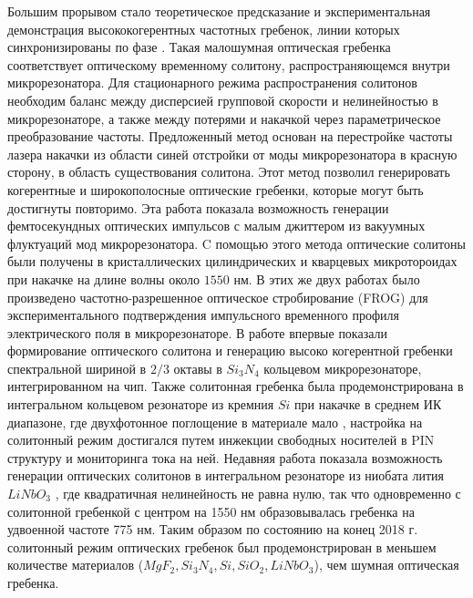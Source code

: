 Большим прорывом стало теоретическое предсказание и экспериментальная демонстрация высококогерентных частотных гребенок, линии которых синхронизированы по фазе \cite{Herr2014}. Такая малошумная оптическая гребенка соответствует оптическому временному солитону, распространяющемся внутри микрорезонатора. Для стационарного режима распространения солитонов необходим баланс между дисперсией групповой скорости и нелинейностью в микрорезонаторе, а также между потерями и накачкой через параметрическое преобразование частоты. Предложенный метод основан на перестройке частоты лазера накачки из области синей отстройки от моды микрорезонатора в красную сторону, в область существования солитона. Этот метод позволил генерировать когерентные и широкополосные оптические гребенки, которые могут быть достигнуты повторимо. Эта работа показала возможность генерации фемтосекундных оптических импульсов с малым джиттером из вакуумных флуктуаций мод микрорезонатора. C помощью этого метода оптические солитоны были получены в кристаллических цилиндрических \cite{Herr2014} и кварцевых микротороидах \cite{Yi2015} при накачке на длине волны около $1550$ нм. В этих же двух работах было произведено частотно-разрешенное оптическое стробирование (FROG) для экспериментального подтверждения импульсного временного профиля электрического поля в микрорезонаторе. В работе \cite{Brasch2016} впервые показали формирование оптического солитона и генерацию высоко когерентной гребенки спектральной шириной в $2/3$ октавы в $Si_3N_4$ кольцевом микрорезонаторе, интегрированном на чип. Также солитонная гребенка была продемонстрирована в интегральном кольцевом резонаторе из кремния $Si$ при накачке в среднем ИК диапазоне, где двухфотонное поглощение в материале мало \cite{Yu2016}, настройка на солитонный режим достигался путем инжекции свободных носителей в PIN структуру и мониторинга тока на ней. Недавняя работа показала возможность генерации оптических солитонов в интегральном резонаторе из ниобата лития $LiNbO_3$ \cite{2018arXiv181209610H}, где квадратичная нелинейность не равна нулю, так что одновременно с солитонной гребенкой с центром на 1550 нм образовывалась гребенка на удвоенной частоте 775 нм. Таким образом по состоянию на конец 2018 г. солитонный режим оптических гребенок был продемонстрирован в меньшем количестве материалов ($MgF_2, Si_3N_4, Si, SiO_2, LiNbO_3$), чем шумная оптическая гребенка.

